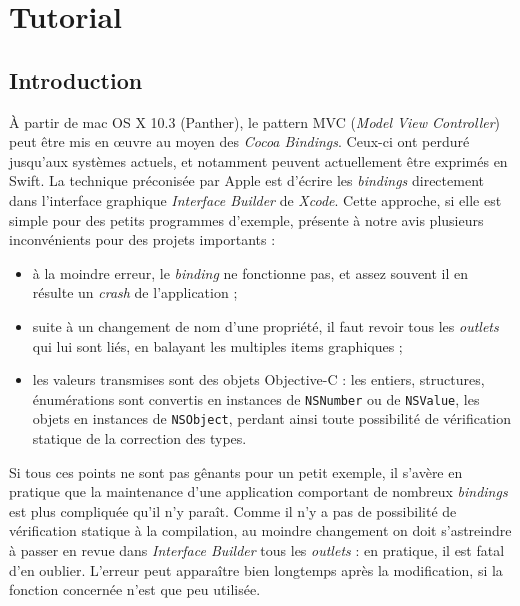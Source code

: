 

\chapter{Tutorial}

\section{Introduction}

À partir de mac OS X 10.3 (Panther), le pattern MVC (\emph{Model View Controller}) peut être mis en œuvre au moyen des \emph{Cocoa Bindings}. Ceux-ci ont perduré jusqu'aux systèmes actuels, et notamment peuvent actuellement être exprimés en Swift. La technique préconisée par Apple est d'écrire les \emph{bindings} directement dans l'interface graphique \emph{Interface Builder} de \emph{Xcode}. Cette approche, si elle est simple pour des petits programmes d'exemple, présente à notre avis plusieurs inconvénients pour des projets importants :
\begin{itemize}
  \item à la moindre erreur, le \emph{binding} ne fonctionne pas, et assez souvent il en résulte un \emph{crash} de l'application ;
  \item suite à un changement de nom d'une propriété, il faut revoir tous les \emph{outlets} qui lui sont liés, en balayant les multiples items graphiques ;
  \item les valeurs transmises sont des objets Objective-C : les entiers, structures, énumérations sont convertis en instances de \texttt{NSNumber} ou de \texttt{NSValue}, les objets en instances de \texttt{NSObject}, perdant ainsi toute possibilité de vérification statique de la correction des types. 
\end{itemize}

Si tous ces points ne sont pas gênants pour un petit exemple, il s'avère en pratique que la maintenance d'une application comportant de nombreux \emph{bindings} est plus compliquée qu'il n'y paraît. Comme il n'y a pas de possibilité de vérification statique à la compilation, au moindre changement on doit s'astreindre à passer en revue dans \emph{Interface Builder} tous les \emph{outlets} : en pratique, il est fatal d'en oublier. L'erreur peut apparaître bien longtemps après la modification, si la fonction concernée n'est que peu utilisée.


